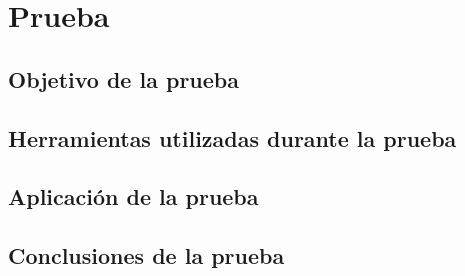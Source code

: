 \section{Prueba}
\subsection{Objetivo de la prueba}
\subsection{Herramientas utilizadas durante la prueba}
\subsection{Aplicación de la prueba}
\subsection{Conclusiones de la prueba}